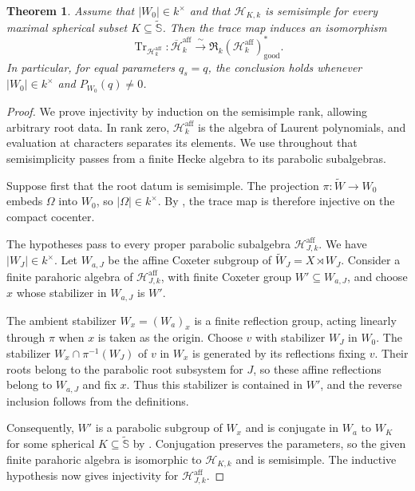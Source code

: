 \documentclass[11pt,letterpaper]{amsart}
\newtheorem{theorem}{Theorem}
\theoremstyle{definition}
\numberwithin{equation}{section}
\numberwithin{theorem}{section}
\newcommand{\kk}{k}
\newcommand{\cH}{\mathcal H}
\newcommand{\bH}{\overline{\mathcal H}}
\newcommand{\cR}{\mathfrak R}
\newcommand{\Wt}{\tilde W}
\newcommand{\Waff}{W_a}
\newcommand{\Saff}{\widetilde{\mathbb S}}
\DeclareMathOperator{\Tr}{Tr}
\begin{document}
\begin{theorem}\label{thm:inj-affine-whole}
Assume that $|W_0|\in\kk^\times$ and that
$\cH_{K,\kk}$ is semisimple for every maximal
spherical subset $K\subseteq\Saff$.
Then the trace map induces an isomorphism
\[
 \Tr_{\cH_\kk^{\mathrm{aff}}}:
 \bH_\kk^{\mathrm{aff}}
 \xrightarrow{\;\sim\;}
 \cR_\kk(\cH_\kk^{\mathrm{aff}})^*_{\mathrm{good}}.
\]
In particular, for equal parameters $q_s=q$, the
conclusion holds whenever $|W_0|\in\kk^\times$
and $P_{W_0}(q)\ne0$.
\end{theorem}
\begin{proof}
We prove injectivity by induction on the semisimple
rank, allowing arbitrary root data.
In rank zero, $\cH_\kk^{\mathrm{aff}}$ is the algebra of Laurent
polynomials, and evaluation at characters
separates its elements.
We use throughout that semisimplicity passes from
a finite Hecke algebra to its parabolic subalgebras.

Suppose first that the root datum is semisimple.
The projection $\pi:\Wt\to W_0$ embeds $\Omega$ into $W_0$,
so $|\Omega|\in\kk^\times$.
By , the trace map is therefore
injective on the compact cocenter.

The hypotheses pass to every proper parabolic subalgebra
$\cH_{J,\kk}^{\mathrm{aff}}$.
We have $|W_J|\in\kk^\times$.
Let $W_{a,J}$ be the affine Coxeter subgroup of
$\Wt_J=X\rtimes W_J$.
Consider a finite parahoric algebra of
$\cH_{J,\kk}^{\mathrm{aff}}$, with finite Coxeter group
$W'\subseteq W_{a,J}$, and choose $x$ whose stabilizer
in $W_{a,J}$ is $W'$.

The ambient stabilizer $W_x=(\Waff)_x$ is a finite
reflection group, acting linearly through $\pi$ when $x$
is taken as the origin. Choose $v$ with stabilizer $W_J$
in $W_0$. The stabilizer $W_x\cap\pi^{-1}(W_J)$ of $v$
in $W_x$ is generated by its reflections fixing $v$.
Their roots belong to the parabolic root subsystem for $J$,
so these affine reflections belong to $W_{a,J}$ and fix $x$.
Thus this stabilizer is contained in $W'$, and the reverse
inclusion follows from the definitions.

Consequently, $W'$ is a parabolic subgroup of $W_x$ and is
conjugate in $\Waff$ to $W_K$ for some spherical
$K\subseteq\Saff$ by \cite[\S1.12 and \S4.8]{Humphreys}.
Conjugation preserves the parameters, so the given finite
parahoric algebra is isomorphic to $\cH_{K,\kk}$ and is
semisimple. The inductive hypothesis now gives injectivity
for $\cH_{J,\kk}^{\mathrm{aff}}$.


\end{proof}
\end{document}
